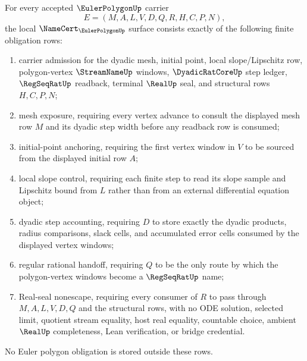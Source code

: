 \begin{theorem}
\label{thm:euler-polygon-namecert-obligations}
For every accepted $\EulerPolygonUp$ carrier
$$
E=(M,A,L,V,D,Q,R,H,C,P,N),
$$
the local $\NameCert_{\EulerPolygonUp}$ surface consists exactly of the following finite obligation rows:
\begin{enumerate}
\item carrier admission for the dyadic mesh, initial point, local slope/Lipschitz row, polygon-vertex $\StreamNameUp$ windows, $\DyadicRatCoreUp$ step ledger, $\RegSeqRatUp$ readback, terminal $\RealUp$ seal, and structural rows $H,C,P,N$;
\item mesh exposure, requiring every vertex advance to consult the displayed mesh row $M$ and its dyadic step width before any readback row is consumed;
\item initial-point anchoring, requiring the first vertex window in $V$ to be sourced from the displayed initial row $A$;
\item local slope control, requiring each finite step to read its slope sample and Lipschitz bound from $L$ rather than from an external differential equation object;
\item dyadic step accounting, requiring $D$ to store exactly the dyadic products, radius comparisons, slack cells, and accumulated error cells consumed by the displayed vertex windows;
\item regular rational handoff, requiring $Q$ to be the only route by which the polygon-vertex windows become a $\RegSeqRatUp$ name;
\item Real-seal nonescape, requiring every consumer of $R$ to pass through $M,A,L,V,D,Q$ and the structural rows, with no ODE solution, selected limit, quotient stream equality, host real equality, countable choice, ambient $\RealUp$ completeness, Lean verification, or bridge credential.
\end{enumerate}
No Euler polygon obligation is stored outside these rows.
\end{theorem}
